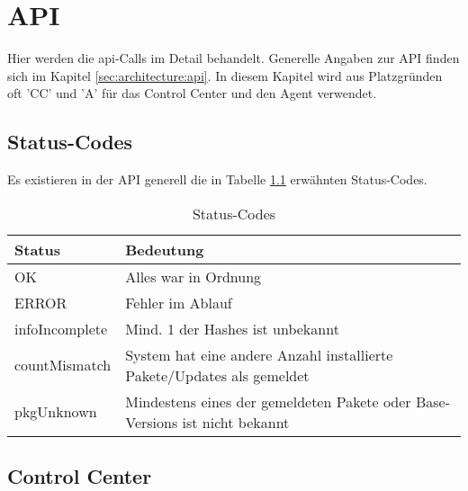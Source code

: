 \begin{comment}

Source: https://redmine.upd89.org/redmine/projects/upd89/wiki/API

\end{comment}

\chapter{API}

Hier werden die \gls{api}-Calls im Detail behandelt. Generelle Angaben zur API finden sich im Kapitel \ref{sec:architecture:api}. In diesem Kapitel wird aus Platzgründen oft 'CC' und 'A' für das Control Center und den Agent verwendet.

\section*{Status-Codes}

Es existieren in der API generell die in Tabelle \ref{api:codes} erwähnten Status-Codes. 

\begin{table}[H]
    \centering
    \caption{Status-Codes}
    \label{api:codes}
    \begin{tabular}{ll}
        \hline
        \textbf{Status} & \textbf{Bedeutung}                                                          \\ \hline
        OK              & Alles war in Ordnung                                                        \\
        ERROR           & Fehler im Ablauf                                                            \\
        infoIncomplete  & Mind. 1 der Hashes ist unbekannt                                            \\
        countMismatch   & System hat eine andere Anzahl installierte Pakete/Updates als gemeldet      \\
        pkgUnknown      & Mindestens eines der gemeldeten Pakete oder Base-Versions ist nicht bekannt \\ \hline
    \end{tabular}
\end{table}


\section*{Control Center}

